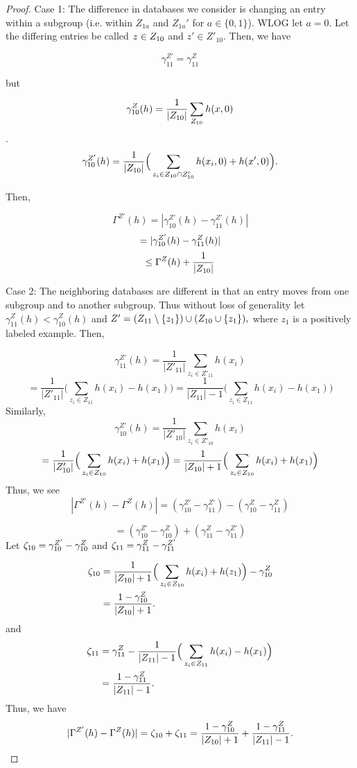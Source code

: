 \begin{proof}

Case 1: The difference in databases we consider is changing an entry within a subgroup
(i.e. within $Z_{1a}$ and $Z_{1a}'$ for $a \in \{0, 1\}$). WLOG let $a
= 0$. Let the differing entries be called $z \in Z_{10}$ and $z' \in
Z'_{10}$. Then, we have

$$\gamma^{Z'}_{11} = \gamma^Z_{11}$$

but

$$\gamma_{10}^Z(h) = \frac{1}{|Z_{10}|} \sum_{Z_{10}} h(x,0)$$.
$$\gamma_{10}^{Z'}(h) = \frac{1}{|Z_{10}|} \Big(\sum_{z_i \in Z_{10} \cap Z_{10}'} h(x_i, 0) + h(x', 0) \Big).$$

Then,

$$ \Gamma^{Z'}(h) = | \gamma_{10}^{Z'}(h) - \gamma_{11}^{Z'}(h) | $$
$$ = | \gamma_{10}^{Z'}(h) - \gamma_{11}^Z(h) | $$
$$ \leq \Gamma^{Z}(h) + \frac{1}{|Z_{10}|} $$


Case 2: The neighboring databases are different in that an entry moves from one subgroup and to another subgroup.
Thus without loss of generality let
$\gamma_{11}^{Z}(h) < \gamma_{10}^{Z}(h)$ and $Z' =(Z_{11}\setminus
\{z_1\} )\cup( Z_{10} \cup \{z_1\}),$ where $z_1$ is a positively labeled example. Then,

$$\gamma_{11}^{Z'}(h) = \frac{1}{|Z'_{11}|} \sum_{z_i \in Z'_{11}} h(x_i)$$
$$= \frac{1}{|Z'_{11}|} \Big(\sum_{z_i \in Z_{11}} h(x_i)-h(x_1)\Big) = \frac{1}{|Z_{11}|-1} \Big(\sum_{z_i \in Z_{11}} h(x_i)-h(x_1)\Big)$$
Similarly,
$$\gamma_{10}^{Z'}(h) = \frac{1}{|Z'_{10}|} \sum_{z_i \in Z'_{10}} h(x_i)$$
$$ = \frac{1}{|Z'_{10}|} \Big( \sum_{z_i \in Z_{10}} h(x_i)+h(x_1) \Big)= \frac{1}{|Z_{10}|+1} \Big( \sum_{z_i \in Z_{10}} h(x_i)+h(x_1) \Big)$$
%
Thus, we see
 $$|\Gamma^{Z'}(h) - \Gamma^{Z}(h)| = (\gamma_{10}^{Z'} - \gamma_{11}^{Z'}) - (\gamma_{10}^{Z} - \gamma_{11}^{Z})$$


$$=(\gamma_{10}^{Z'}- \gamma_{10}^{Z}) + (\gamma_{11}^{Z} -\gamma_{11}^{Z'})$$
%
Let $\zeta_{10}= \gamma_{10}^{Z'}- \gamma_{10}^{Z}$ and  $\zeta_{11} = \gamma_{11}^{Z} -\gamma_{11}^{Z'}$

\begin{align*}
	\zeta_{10} &= \frac{1}{|Z_{10}|+1} \Big( \sum_{z_i \in Z_{10}} h(x_i)+h(z_1) \Big) - \gamma_{10}^{Z} \\
	&= \frac{1 - \gamma_{10}^Z}{|Z_{10}| + 1}.
\end{align*}
%
and
\begin{align*}
	\zeta_{11} &= \gamma_{11}^{Z}- \frac{1}{|Z_{11}|-1} \Big(\sum_{z_i \in Z_{11}} h(x_i)-h(x_1) \Big) \\
	&=\frac{1 -\gamma_{11}^Z}{|Z_{11}| - 1}.
\end{align*}
%
Thus, we have
$$|\Gamma^{Z'}(h)- \Gamma^{Z}(h)| = \zeta_{10} + \zeta_{11} =
\frac{1 - \gamma_{10}^Z}{|Z_{10}|+1} + \frac{1 - \gamma_{11}^Z}{|Z_{11}|-1}. $$
\end{proof}

